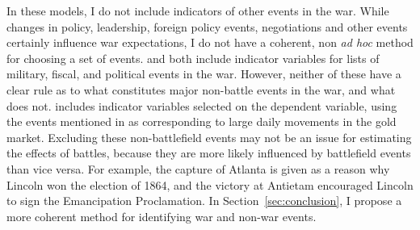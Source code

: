 In these models, I do not include indicators of other events in the war.
While changes in policy, leadership, foreign policy events, negotiations and other events certainly influence war expectations, I do not have a coherent, non \textit{ad hoc} method for choosing a set of events.
\textcite{McCandless1996} and \textcite{SmithSmith1997} both include indicator variables for lists of military, fiscal, and political events in the war.
However, neither of these have a clear rule as to what constitutes major non-battle events in the war, and what does not.
\textcite{SmithSmith1997} includes indicator variables selected on the dependent variable, using the events mentioned in \textcite{Mitchell1903} as corresponding to large daily movements in the gold market.%
Excluding these non-battlefield events may not be an issue for estimating the effects of battles, because they are more likely influenced by battlefield events than vice versa.
For example, the capture of Atlanta is given as a reason why Lincoln won the election of 1864, and the victory at Antietam encouraged Lincoln to sign the Emancipation Proclamation.
In Section~\ref{sec:conclusion}, I propose a more coherent method for identifying war and non-war events.

